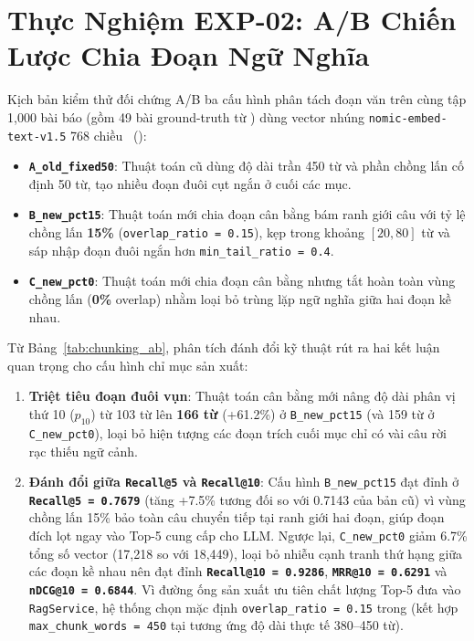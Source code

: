 \section{Thực Nghiệm EXP-02: A/B Chiến Lược Chia Đoạn Ngữ Nghĩa}
\label{sec:ch5_chunking_ab}

Kịch bản  kiểm thử đối chứng A/B ba cấu hình phân tách đoạn văn trên cùng tập 1,000 bài báo (gồm 49 bài ground-truth từ ) dùng vector nhúng \texttt{nomic-embed-text-v1.5} 768 chiều~\cite{nussbaum2024nomic,nomicmodelcard2024} ():
\begin{itemize}
  \item \textbf{\texttt{A\_old\_fixed50}}: Thuật toán cũ dùng độ dài trần 450 từ và phần chồng lấn cố định 50 từ, tạo nhiều đoạn đuôi cụt ngắn ở cuối các mục.
  \item \textbf{\texttt{B\_new\_pct15}}: Thuật toán mới chia đoạn cân bằng bám ranh giới câu với tỷ lệ chồng lấn \textbf{15\%} (\texttt{overlap\_ratio = 0.15}), kẹp trong khoảng $[20, 80]$ từ và sáp nhập đoạn đuôi ngắn hơn \texttt{min\_tail\_ratio = 0.4}.
  \item \textbf{\texttt{C\_new\_pct0}}: Thuật toán mới chia đoạn cân bằng nhưng tắt hoàn toàn vùng chồng lấn (\textbf{0\%} overlap) nhằm loại bỏ trùng lặp ngữ nghĩa giữa hai đoạn kề nhau.
\end{itemize}



Từ Bảng~\ref{tab:chunking_ab}, phân tích đánh đổi kỹ thuật rút ra hai kết luận quan trọng cho cấu hình chỉ mục sản xuất:
\begin{enumerate}[label=\textbf{\arabic*.}]
  \item \textbf{Triệt tiêu đoạn đuôi vụn}: Thuật toán cân bằng mới nâng độ dài phân vị thứ 10 ($p_{10}$) từ 103 từ lên \textbf{166 từ} (+61.2\%) ở \texttt{B\_new\_pct15} (và 159 từ ở \texttt{C\_new\_pct0}), loại bỏ hiện tượng các đoạn trích cuối mục chỉ có vài câu rời rạc thiếu ngữ cảnh.
  \item \textbf{Đánh đổi giữa \texttt{Recall@5} và \texttt{Recall@10}}: Cấu hình \texttt{B\_new\_pct15} đạt đỉnh ở \textbf{\texttt{Recall@5 = 0.7679}} (tăng +7.5\% tương đối so với 0.7143 của bản cũ) vì vùng chồng lấn 15\% bảo toàn câu chuyển tiếp tại ranh giới hai đoạn, giúp đoạn đích lọt ngay vào Top-5 cung cấp cho LLM. Ngược lại, \texttt{C\_new\_pct0} giảm 6.7\% tổng số vector (17,218 so với 18,449), loại bỏ nhiễu cạnh tranh thứ hạng giữa các đoạn kề nhau nên đạt đỉnh \textbf{\texttt{Recall@10 = 0.9286}}, \textbf{\texttt{MRR@10 = 0.6291}} và \textbf{\texttt{nDCG@10 = 0.6844}}. Vì đường ống sản xuất ưu tiên chất lượng Top-5 đưa vào \texttt{RagService}, hệ thống chọn mặc định \texttt{overlap\_ratio = 0.15} trong  (kết hợp \texttt{max\_chunk\_words = 450} tại  tương ứng độ dài thực tế 380--450 từ).
\end{enumerate}

